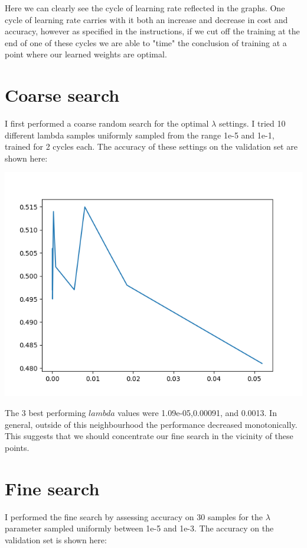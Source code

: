 \documentclass[11pt,a4paper]{article}
\begin{document}
Here we can clearly see the cycle of learning rate reflected in the graphs. One cycle of learning rate carries with it both an increase and decrease in cost and accuracy, however as specified in the instructions, if we cut off the training at the end of one of these cycles we are able to "time" the conclusion of training at a point where our learned weights are optimal.

\section{Coarse search}

I first performed a coarse random search for the optimal $\lambda$ settings. I tried 10 different lambda samples uniformly sampled from the range 1e-5 and 1e-1, trained for 2 cycles each. The accuracy of these settings on the validation set are shown here:

\includegraphics[width=\textwidth]{coarse_search.png}

The 3 best performing $lambda$ values were 1.09e-05,0.00091, and 0.0013. In general, outside of this neighbourhood the performance decreased monotonically. This suggests that we should concentrate our fine search in the vicinity of these points.


\section{Fine search}

I performed the fine search by assessing accuracy on 30 samples for the $\lambda$ parameter sampled uniformly between 1e-5 and 1e-3. The accuracy on the validation set is shown here:
\end{document}
